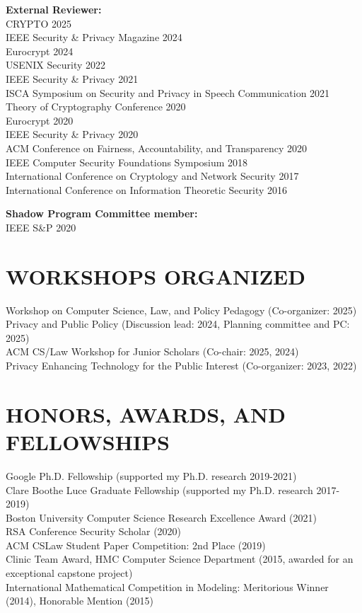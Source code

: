 \documentclass{res}
\begin{document}
\begin{resume}
\textbf{External Reviewer:} \\
CRYPTO 2025 \\
IEEE Security \& Privacy Magazine 2024 \\
Eurocrypt 2024 \\
USENIX Security 2022 \\
IEEE Security \& Privacy 2021 \\
ISCA Symposium on Security and Privacy in Speech Communication 2021 \\
Theory of Cryptography Conference 2020 \\
Eurocrypt 2020 \\
IEEE Security \& Privacy 2020 \\
ACM Conference on Fairness, Accountability, and Transparency 2020 \\
IEEE Computer Security Foundations Symposium 2018 \\
International Conference on Cryptology and Network Security 2017 \\
International Conference on Information Theoretic Security 2016

\textbf{Shadow Program Committee member:} \\
IEEE S\&P 2020



\section{WORKSHOPS ORGANIZED}
\vspace{0.1in}
Workshop on Computer Science, Law, and Policy Pedagogy (Co-organizer: 2025) \\
Privacy and Public Policy (Discussion lead: 2024, Planning committee and PC: 2025) \\
ACM CS/Law Workshop for Junior Scholars (Co-chair: 2025, 2024) \\
Privacy Enhancing Technology for the Public Interest (Co-organizer: 2023, 2022)



\section{HONORS, AWARDS, AND FELLOWSHIPS}
\vspace{0.1in}
    Google Ph.D. Fellowship (supported my Ph.D. research 2019-2021) \\
    Clare Boothe Luce Graduate Fellowship (supported my Ph.D. research 2017-2019) \\
    Boston University Computer Science Research Excellence Award (2021) \\
    RSA Conference Security Scholar (2020) \\
    ACM CSLaw Student Paper Competition: 2nd Place (2019) \\
    Clinic Team Award, HMC Computer Science Department (2015, awarded for an exceptional capstone project) \\
    International Mathematical Competition in Modeling: Meritorious Winner (2014), Honorable Mention (2015) \\       




\end{resume}
\end{document}
